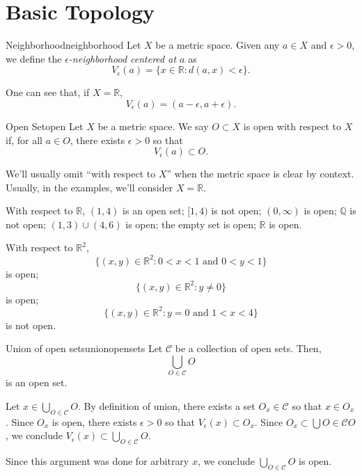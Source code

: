 
\chapter{Basic Topology} 

\begin{defn}{Neighborhood}{neighborhood}
	Let \(X\) be a metric space.
	Given any \(a \in X\) and \(\epsilon > 0\), we define the \emph{\(\epsilon\)-neighborhood centered at \(a\)} as \[
		V_{\epsilon}(a) = \{x \in \mathbb{R} : d(a, x) < \epsilon\}.
	\]
\end{defn}

One can see that, if \(X = \mathbb{R}\), \[
	V_\epsilon(a) = (a - \epsilon, a + \epsilon).
\]

\begin{defn}{Open Set}{open}
	Let \(X\) be a metric space.
	We say \(O \subset X\) is open with respect to \(X\) if, for all \(a \in O\), there exists \(\epsilon > 0\) so that \[
		V_\epsilon(a) \subset O.
	\]
\end{defn}

We'll usually omit ``with respect to \(X\)'' when the metric space is clear by context. Usually, in the examples, we'll consider \(X = \mathbb{R}\).

\begin{exmp}{}{}
	With respect to \(\mathbb{R}\),
	\((1, 4)\) is an open set;
	\([1, 4)\) is not open;
	\((0, \infty)\) is open;
	\(\mathbb{Q}\) is not open;
	\((1, 3) \cup (4, 6)\) is open;
	the empty set is open;
	\(\mathbb{R}\) is open.

	With respect to \(\mathbb{R}^2\),
	\[
		\{(x, y) \in \mathbb{R}^2 : 0 < x < 1 \text{ and } 0 < y < 1\}
	\]
	is open;
	\[
		\{(x, y) \in \mathbb{R}^2 : y \neq 0\}
	\]
	is open;
	\[
		\{ (x, y) \in \mathbb{R}^2 : y=0 \text{ and } 1 < x < 4 \}
	\]
	is not open.
\end{exmp}

\begin{prop}{Union of open sets}{unionopensets}
	Let \(\mathcal C\) be a collection of open sets. Then, \[
		\bigcup_{O \in \mathcal C} O
	\] is an open set.
\end{prop}

\begin{dem}{}{}
	Let \(x \in \bigcup_{O \in \mathcal C} O\). By definition of union, there exists a set \(O_x \in \mathcal C\) so that \(x \in O_x\). Since \(O_x\) is open, there exists \(\epsilon > 0\) so that \(V_\epsilon(x) \subset O_x\). Since \(O_x \subset \bigcup{O \in \mathcal C} O\), we conclude \(V_\epsilon(x) \subset \bigcup_{O \in \mathcal C} O\).

	Since this argument was done for arbitrary \(x\), we conclude \(\bigcup_{O \in \mathcal C} O\) is open.
\end{dem}

